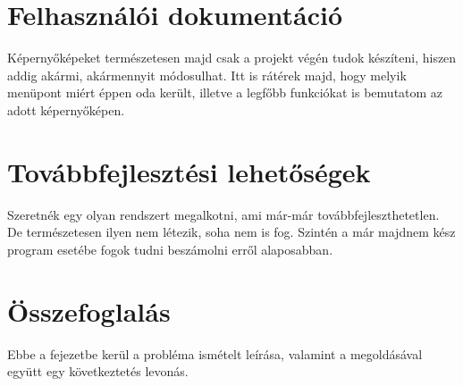 \documentclass[
]{thesis-ekf}
\begin{document}
\chapter{Felhasználói dokumentáció}
Képernyőképeket természetesen majd csak a projekt végén tudok készíteni, hiszen addig akármi, akármennyit módosulhat. Itt is rátérek majd, hogy melyik menüpont miért éppen oda került, illetve a legfőbb funkciókat is bemutatom az adott képernyőképen.
\chapter{Továbbfejlesztési lehetőségek}
Szeretnék egy olyan rendszert megalkotni, ami már-már továbbfejleszthetetlen. De természetesen ilyen nem létezik, soha nem is fog. Szintén a már majdnem kész program esetébe fogok tudni beszámolni erről alaposabban.
\chapter{Összefoglalás}
Ebbe a fejezetbe kerül a probléma ismételt leírása, valamint a megoldásával együtt egy következtetés levonás.
\begin{thebibliography}{}
\end{thebibliography}
\end{document}

